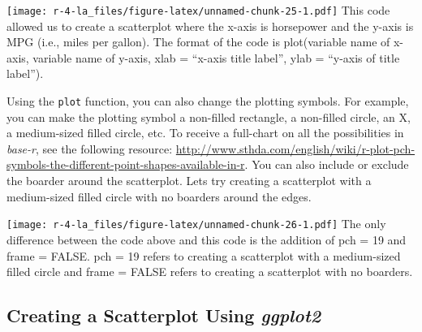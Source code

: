 \documentclass[
]{book}
\newenvironment{Shaded}{\begin{snugshade}}{\end{snugshade}}
\newcommand{\AttributeTok}[1]{\textcolor[rgb]{0.77,0.63,0.00}{#1}}
\newcommand{\ConstantTok}[1]{\textcolor[rgb]{0.00,0.00,0.00}{#1}}
\newcommand{\DecValTok}[1]{\textcolor[rgb]{0.00,0.00,0.81}{#1}}
\newcommand{\FunctionTok}[1]{\textcolor[rgb]{0.00,0.00,0.00}{#1}}
\newcommand{\NormalTok}[1]{#1}
\newcommand{\SpecialCharTok}[1]{\textcolor[rgb]{0.00,0.00,0.00}{#1}}
\newcommand{\StringTok}[1]{\textcolor[rgb]{0.31,0.60,0.02}{#1}}
\begin{document}
\begin{Shaded}
\end{Shaded}

\texttt{[image: r-4-la\_files/figure-latex/unnamed-chunk-25-1.pdf]}
This code allowed us to create a scatterplot where the x-axis is horsepower and the y-axis is MPG (i.e., miles per gallon). The format of the code is plot(variable name of x-axis, variable name of y-axis, xlab = ``x-axis title label'', ylab = ``y-axis of title label'').

Using the \texttt{plot} function, you can also change the plotting symbols. For example, you can make the plotting symbol a non-filled rectangle, a non-filled circle, an X, a medium-sized filled circle, etc. To receive a full-chart on all the possibilities in \emph{base-r}, see the following resource: \url{http://www.sthda.com/english/wiki/r-plot-pch-symbols-the-different-point-shapes-available-in-r}. You can also include or exclude the boarder around the scatterplot. Lets try creating a scatterplot with a medium-sized filled circle with no boarders around the edges.

\begin{Shaded}
\end{Shaded}

\texttt{[image: r-4-la\_files/figure-latex/unnamed-chunk-26-1.pdf]}
The only difference between the code above and this code is the addition of pch = 19 and frame = FALSE. pch = 19 refers to creating a scatterplot with a medium-sized filled circle and frame = FALSE refers to creating a scatterplot with no boarders.

\hypertarget{creating-a-scatterplot-using-ggplot2}{%
\subsection{\texorpdfstring{Creating a Scatterplot Using \emph{ggplot2}}{Creating a Scatterplot Using ggplot2}}\label{creating-a-scatterplot-using-ggplot2}}
\end{document}
